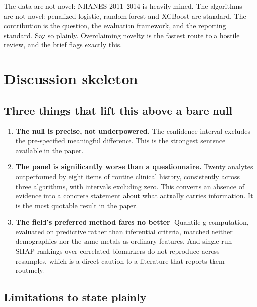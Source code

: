 \documentclass[11pt]{article}
\begin{document}
The data are not novel: NHANES 2011--2014 is heavily mined. The algorithms are not novel: penalized logistic, random forest and XGBoost are standard. The contribution is the question, the evaluation framework, and the reporting standard. Say so plainly. Overclaiming novelty is the fastest route to a hostile review, and the brief flags exactly this.

\section{Discussion skeleton}

\subsection*{Three things that lift this above a bare null}

\begin{enumerate}[leftmargin=1.4em,itemsep=5pt,topsep=4pt]
\item \textbf{The null is precise, not underpowered.} The confidence interval excludes the pre-specified meaningful difference. This is the strongest sentence available in the paper.
\item \textbf{The panel is significantly worse than a questionnaire.} Twenty analytes outperformed by eight items of routine clinical history, consistently across three algorithms, with intervals excluding zero. This converts an absence of evidence into a concrete statement about what actually carries information. It is the most quotable result in the paper.
\item \textbf{The field's preferred method fares no better.} Quantile g-computation, evaluated on predictive rather than inferential criteria, matched neither demographics nor the same metals as ordinary features. And single-run SHAP rankings over correlated biomarkers do not reproduce across resamples, which is a direct caution to a literature that reports them routinely.
\end{enumerate}

\subsection*{Limitations to state plainly}
\end{document}
